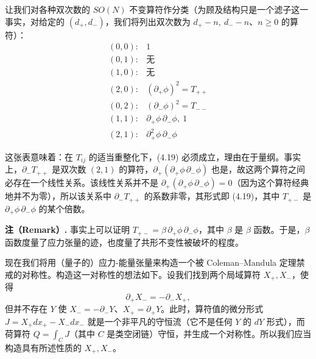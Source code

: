 让我们对各种双次数的 $SO(N)$ 不变算符作分类（为顾及结构只是一个滤子这一事实，对给定的 $(d_+,d_-)$，我们将列出双次数为 $d_+-n,\ d_--n$、$n\ge0$ 的算符）：
\[
\begin{array}{ll}
(0,0): & 1\\
(0,1): & \text{无}\\
(1,0): & \text{无}\\
(2,0): & (\partial_+\phi)^2=T_{++}\\
(0,2): & (\partial_-\phi)^2=T_{--}\\
(1,1): & \partial_+\phi\,\partial_-\phi,\ 1\\
(2,1): & \partial_+^2\phi\,\partial_-\phi
\end{array}
\]

这张表意味着：在 $T_{ij}$ 的适当重整化下，(4.19) 必须成立，理由在于量纲。事实上，$\partial_-T_{++}$ 是双次数 $(2,1)$ 的算符，$\partial_+(\partial_+\phi\,\partial_-\phi)$ 也是，故这两个算符之间必存在一个线性关系。该线性关系并不是 $\partial_+(\partial_+\phi\,\partial_-\phi)=0$（因为这个算符经典地并不为零），所以该关系中 $\partial_-T_{++}$ 的系数非零，其形式即 (4.19)，其中 $T_{+-}$ 是 $\partial_+\phi\,\partial_-\phi$ 的某个倍数。

\textbf{注（Remark）.} 事实上可以证明 $T_{+-}=\beta\,\partial_+\phi\,\partial_-\phi$，其中 $\beta$ 是 $\beta$ 函数。于是，$\beta$ 函数度量了应力张量的迹，也度量了共形不变性被破坏的程度。

现在我们将用（量子的）应力-能量张量来构造一个被 Coleman–Mandula 定理禁戒的对称性。构造这一对称性的想法如下。设我们找到两个局域算符 $X_+,X_-$，使得
\[
\partial_+X_-=-\partial_-X_+,
\]
但并不存在 $Y$ 使 $X_-=-\partial_-Y$、$X_+=\partial_+Y$。此时，算符值的微分形式 $J=X_+dx_+-X_-dx_-$ 就是一个非平凡的守恒流（它不是任何 $Y$ 的 $dY$ 形式），而荷算符 $Q=\int_C J$（其中 $C$ 是类空闭链）守恒，并生成一个对称性。所以我们应当构造具有所述性质的 $X_+,X_-$。



